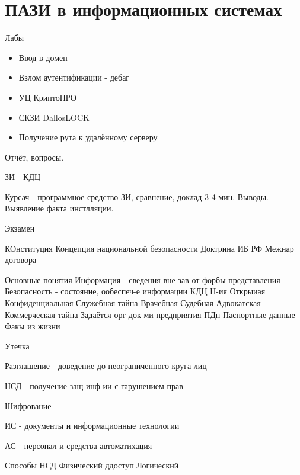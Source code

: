 \documentclass[a4paper,12pt]{report}
\begin{document}
	\def \nocredits {}
	\def \LineE {Конспект по дисциплине}
	\def \LineF {Программно-аппаратные средства защиты информации}

	\maketitle



\section{ПАЗИ в информационных системах}


	Лабы
	\begin{itemize}
	\item	Ввод в домен
	\item	Взлом аутентификации - дебаг
	\item	УЦ КриптоПРО
	\item	СКЗИ DallosLOCK
	\item	Получение рута к удалённому серверу
	\end{itemize}
	Отчёт, вопросы.

	ЗИ - КДЦ

	Курсач - программное средство ЗИ, сравнение, доклад 3-4 мин. Выводы. Выявление факта инстлляции.

	Экзамен

	КОнституция
	Концепция национальной безопасности
	Доктрина ИБ РФ
	Межнар договора

	Основные понятия
		Информация - сведения вне зав от форбы представления
		Безопасность - состояние, ообеспеч-е информации КДЦ
	Н-ия
		Открыиая
		Конфиденциальная
			Служебная тайна
				Врачебная
				Судебная
				Адвокатская
			Коммерческая тайна
				Задаётся орг док-ми предприятия
			ПДн
				Паспортные данные
				Факы из жизни

	Утечка

	Разглашение - доведение до неограниченного круга лиц

	НСД - получение защ инф-ии с гарушением прав

	Шифрование

	ИС - документы и информационные технологии

	АС - персонал и средства автоматихация

	Способы НСД
		Физический ддоступ
		Логический
\end{document}
